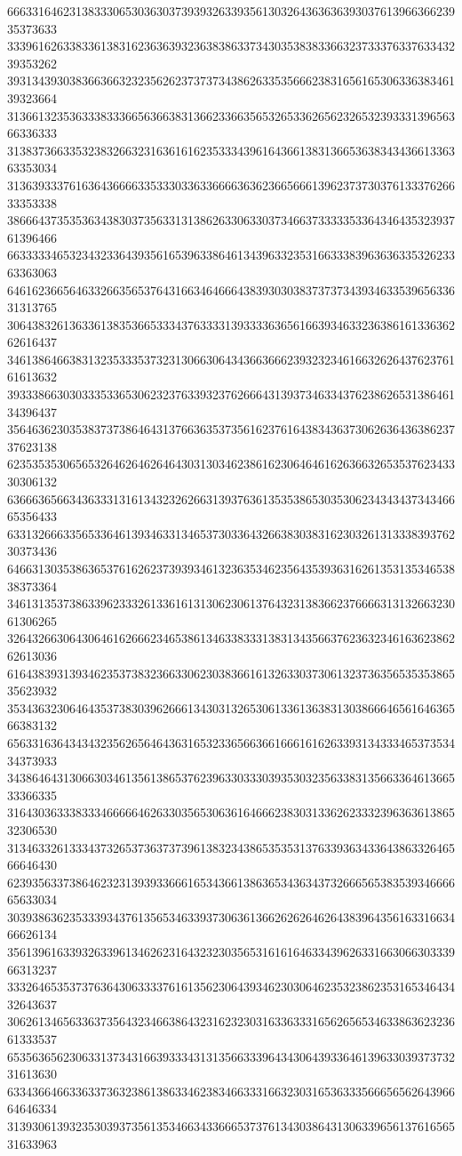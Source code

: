 66633164623138333065303630373939326339356130326436363639303761396636623935373633
33396162633833613831623636393236383863373430353838336632373337633763343239353262
39313439303836636632323562623737373438626335356662383165616530633638346139323664
31366132353633383336656366383136623366356532653362656232653239333139656366336333
31383736633532383266323163616162353334396164366138313665363834343661336363353034
31363933376163643666633533303363366663636236656661396237373037613337626633353338
38666437353536343830373563313138626330633037346637333335336434643532393761396466
66333334653234323364393561653963386461343963323531663338396363633532623363363063
64616236656463326635653764316634646664383930303837373734393463353965633631313765
30643832613633613835366533343763333139333363656166393463323638616133636262616437
34613864663831323533353732313066306434366366623932323461663262643762376161613632
39333866303033353365306232376339323762666431393734633437623862653138646134396437
35646362303538373738646431376636353735616237616438343637306263643638623737623138
62353535306565326462646264643031303462386162306464616263663265353762343330306132
63666365663436333131613432326266313937636135353865303530623434343734346665356433
63313266633565336461393463313465373033643266383038316230326131333839376230373436
64663130353863653761626237393934613236353462356435393631626135313534653838373364
34613135373863396233326133616131306230613764323138366237666631313266323061306265
32643266306430646162666234653861346338333138313435663762363234616362386262613036
61643839313934623537383236633062303836616132633037306132373635653535386535623932
35343632306464353738303962666134303132653061336136383130386664656164636566383132
65633163643434323562656464363165323365663661666161626339313433346537353434373933
34386464313066303461356138653762396330333039353032356338313566336461366533366335
31643036333833346666646263303565306361646662383031336262333239636361386532306530
31346332613334373265373637373961383234386535353137633936343364386332646566646430
62393563373864623231393933666165343661386365343634373266656538353934666665633034
30393863623533393437613565346339373063613662626264626438396435616331663466626134
35613961633932633961346262316432323035653161616463343962633166306630333966313237
33326465353737636430633337616135623064393462303064623532386235316534643432643637
30626134656336373564323466386432316232303163363331656265653463386362323661333537
65356365623063313734316639333431313566333964343064393364613963303937373231613630
63343664663363373632386138633462383466333166323031653633356665656264396664646334
31393061393235303937356135346634336665373761343038643130633965613761656531633963
